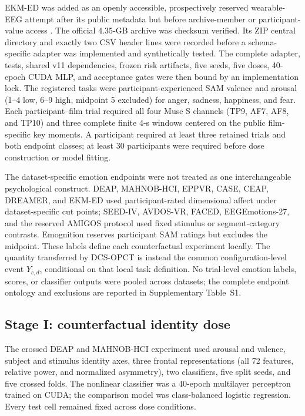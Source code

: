 \documentclass[preprint,12pt]{elsarticle}
\begin{document}
EKM-ED was added as an openly accessible, prospectively reserved wearable-EEG attempt after its public metadata but before archive-member or participant-value access \cite{garciamoreno2023ekmed}. The official 4.35-GB archive was checksum verified. Its ZIP central directory and exactly two CSV header lines were recorded before a schema-specific adapter was implemented and synthetically tested. The complete adapter, tests, shared v11 dependencies, frozen risk artifacts, five seeds, five doses, 40-epoch CUDA MLP, and acceptance gates were then bound by an implementation lock. The registered tasks were participant-experienced SAM valence and arousal (1--4 low, 6--9 high, midpoint 5 excluded) for anger, sadness, happiness, and fear. Each participant--film trial required all four Muse S channels (TP9, AF7, AF8, and TP10) and three complete finite 4-s windows centered on the public film-specific key moments. A participant required at least three retained trials and both endpoint classes; at least 30 participants were required before dose construction or model fitting.

The dataset-specific emotion endpoints were not treated as one interchangeable psychological construct. DEAP, MAHNOB-HCI, EPPVR, CASE, CEAP, DREAMER, and EKM-ED used participant-rated dimensional affect under dataset-specific cut points; SEED-IV, AVDOS-VR, FACED, EEGEmotions-27, and the reserved AMIGOS protocol used fixed stimulus or segment-category contrasts. Emognition reserves participant SAM ratings but excludes the midpoint. These labels define each counterfactual experiment locally. The quantity transferred by DCS-OPCT is instead the common configuration-level event $Y_{c,d}$, conditional on that local task definition. No trial-level emotion labels, scores, or classifier outputs were pooled across datasets; the complete endpoint ontology and exclusions are reported in Supplementary Table~S1.

\subsection{Stage I: counterfactual identity dose}
\label{subsec:dose}

The crossed DEAP and MAHNOB-HCI experiment used arousal and valence, subject and stimulus identity axes, three frontal representations (all 72 features, relative power, and normalized asymmetry), two classifiers, five split seeds, and five crossed folds. The nonlinear classifier was a 40-epoch multilayer perceptron trained on CUDA; the comparison model was class-balanced logistic regression. Every test cell remained fixed across dose conditions.
\end{document}
